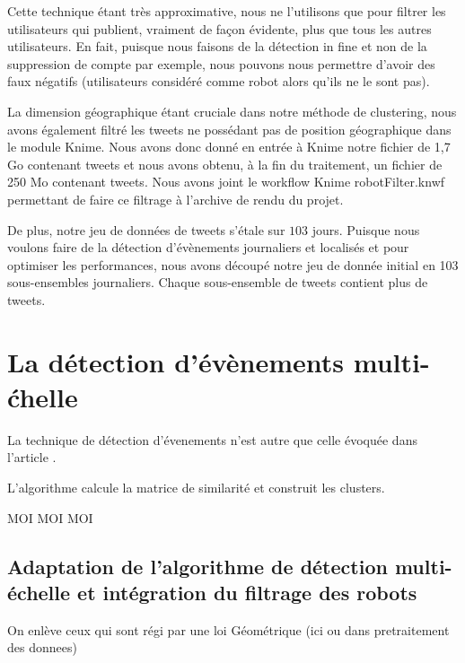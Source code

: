 \documentclass[12pt]{article}
\begin{document}
Cette technique \'etant tr\`es approximative, nous ne l'utilisons que pour filtrer les utilisateurs qui publient, vraiment de fa\c{c}on \'evidente, plus que tous les autres utilisateurs. En fait, puisque nous faisons de la d\'etection in fine et non de la suppression de compte par exemple, nous pouvons nous permettre d'avoir des faux n\'egatifs (utilisateurs consid\'er\'e comme robot alors qu'ils ne le sont pas). 

La dimension g\'eographique \'etant cruciale dans notre m\'ethode de clustering, nous avons \'egalement filtr\'e les tweets ne poss\'edant pas de position g\'eographique dans le module Knime. Nous avons donc donn\'e en entr\'ee \`{a} Knime notre fichier de 1,7 Go contenant  tweets et nous avons obtenu, \`{a} la fin du traitement, un fichier de 250 Mo contenant  tweets. Nous avons joint le workflow Knime robotFilter.knwf permettant de faire ce filtrage \`a l'archive de rendu du projet.

De plus, notre jeu de donn\'ees de tweets s'\'etale sur $103$ jours. Puisque nous voulons faire de la d\'etection d'\'ev\`enements journaliers et localis\'es et pour optimiser les performances, nous avons d\'ecoup\'e notre jeu de donn\'ee initial en 103 sous-ensembles journaliers. Chaque sous-ensemble de tweets contient plus de  tweets.

\vfill
\newpage

\section{La d\'etection d'\'ev\`enements multi-\'chelle}
\label{sec:multiscale}

La technique de d\'etection d'\'evenements n'est autre que celle \'evoqu\'ee dans l'article \cite{Multievents}.

L'algorithme calcule la matrice de similarit\'e et construit les clusters.

MOI
\newline 
MOI 
\newline
MOI

\subsection{Adaptation de l'algorithme de d\'etection multi-\'echelle et int\'egration du filtrage des robots}

On enl\`eve ceux qui sont r\'egi par une loi G\'eom\'etrique (ici ou dans pretraitement des donnees)
\end{document}

